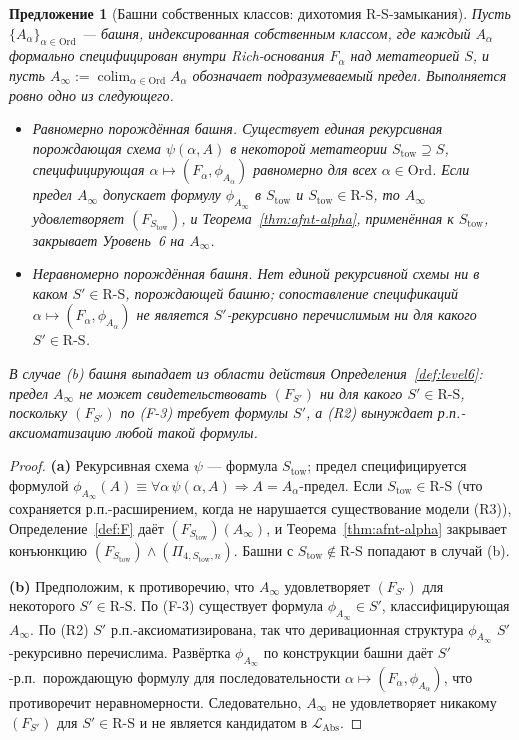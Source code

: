 \documentclass[11pt]{article}
\theoremstyle{plain}
\newtheorem{proposition}[theorem]{Предложение}
\theoremstyle{definition}
\newcommand{\RS}{\mathrm{R\text{-}S}}
\newcommand{\LAbs}{\mathcal{L}_{\mathrm{Abs}}}
\DeclareMathOperator{\colim}{colim}
\begin{document}
\begin{proposition}[Башни собственных классов: дихотомия $\RS$-замыкания]\label{prop:proper-class}
Пусть $\{A_\alpha\}_{\alpha \in \mathrm{Ord}}$ — башня, индексированная собственным классом, где каждый $A_\alpha$ формально специфицирован внутри Rich-основания $F_\alpha$ над метатеорией $S$, и пусть $A_\infty := \colim_{\alpha \in \mathrm{Ord}} A_\alpha$ обозначает подразумеваемый предел. Выполняется ровно одно из следующего.
\begin{itemize}
\item[\textbf{(a)}] \emph{Равномерно порождённая башня.} Существует единая рекурсивная порождающая схема $\psi(\alpha, A)$ в некоторой метатеории $S_{\mathrm{tow}} \supseteq S$, специфицирующая $\alpha \mapsto (F_\alpha, \phi_{A_\alpha})$ равномерно для всех $\alpha \in \mathrm{Ord}$. Если предел $A_\infty$ допускает формулу $\phi_{A_\infty}$ в $S_{\mathrm{tow}}$ и $S_{\mathrm{tow}} \in \RS$, то $A_\infty$ удовлетворяет $(F_{S_{\mathrm{tow}}})$, и Теорема~\ref{thm:afnt-alpha}, применённая к $S_{\mathrm{tow}}$, закрывает Уровень~6 на $A_\infty$.
\item[\textbf{(b)}] \emph{Неравномерно порождённая башня.} Нет единой рекурсивной схемы ни в каком $S' \in \RS$, порождающей башню; сопоставление спецификаций $\alpha \mapsto (F_\alpha, \phi_{A_\alpha})$ не является $S'$-рекурсивно перечислимым ни для какого $S' \in \RS$.
\end{itemize}
В случае (b) башня выпадает из области действия Определения~\ref{def:level6}: предел $A_\infty$ не может свидетельствовать $(F_{S'})$ ни для какого $S' \in \RS$, поскольку $(F_{S'})$ по (F-3) требует формулы $S'$, а (R2) вынуждает р.п.-аксиоматизацию любой такой формулы.
\end{proposition}

\begin{proof}
\textbf{(a)} Рекурсивная схема $\psi$ — формула $S_{\mathrm{tow}}$; предел специфицируется формулой $\phi_{A_\infty}(A) \equiv \forall \alpha\,\psi(\alpha, A) \Rightarrow A = A_\alpha\text{-предел}$. Если $S_{\mathrm{tow}} \in \RS$ (что сохраняется р.п.-расширением, когда не нарушается существование модели (R3)), Определение~\ref{def:F} даёт $(F_{S_{\mathrm{tow}}})(A_\infty)$, и Теорема~\ref{thm:afnt-alpha} закрывает конъюнкцию $(F_{S_{\mathrm{tow}}}) \wedge (\Pi_{4, S_{\mathrm{tow}}, n})$. Башни с $S_{\mathrm{tow}} \notin \RS$ попадают в случай (b).

\textbf{(b)} Предположим, к противоречию, что $A_\infty$ удовлетворяет $(F_{S'})$ для некоторого $S' \in \RS$. По (F-3) существует формула $\phi_{A_\infty} \in S'$, классифицирующая $A_\infty$. По (R2) $S'$ р.п.-аксиоматизирована, так что деривационная структура $\phi_{A_\infty}$ $S'$-рекурсивно перечислима. Развёртка $\phi_{A_\infty}$ по конструкции башни даёт $S'$-р.п.\ порождающую формулу для последовательности $\alpha \mapsto (F_\alpha, \phi_{A_\alpha})$, что противоречит неравномерности. Следовательно, $A_\infty$ не удовлетворяет никакому $(F_{S'})$ для $S' \in \RS$ и не является кандидатом в $\LAbs$.
\end{proof}
\end{document}
